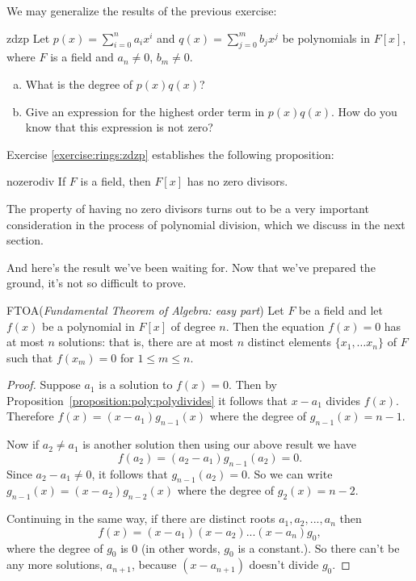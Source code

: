 \noindent
We may generalize the results of the previous exercise:

\begin{exercise}{zdzp}
Let $p(x)=\sum_{i=0}^{n} a_ix^i$ and $q(x)=\sum_{j=0}^{m} b_jx^j$ be polynomials in $F[x]$, where $F$ is a field and $a_n\neq 0$, $b_m\neq 0$.
\begin{enumerate}[(a)]
\item
What is the degree of $p(x)q(x)$?
\item
Give an expression for the highest order term in $p(x)q(x)$. How do you know that this expression is not zero? 
\end{enumerate}
\end{exercise}

Exercise \ref{exercise:rings:zdzp} establishes the following proposition: 

\begin{prop}{nozerodiv} If $F$ is a field, then $F[x]$ has no zero divisors.
\end{prop}

The property of having no zero divisors turns out to be a very important consideration in the process of polynomial division, which we discuss in the next section.

And here's the result we've been waiting for. Now that we've prepared the ground, it's not so difficult to prove.

\begin{prop}{FTOA}(\emph{Fundamental Theorem of Algebra: easy part})
Let $F$ be a field and let $f(x)$ be a polynomial in $F[x]$ of degree $n$. Then the equation $f(x)=0$ has at most $n$ solutions: that is, there are at most $n$ distinct elements $\{x_1,\ldots x_n\}$ of $F$ such that $f(x_m)=0$ for $1 \le m \le n$.
\end {prop}


\begin{proof}
Suppose $a_1$ is a solution to $f(x)=0$. Then by Proposition~\ref{proposition:poly:polydivides} it follows that $x-a_1$ divides $f(x)$. Therefore $f(x) = (x-a_1) g_{n-1}(x)$ where the degree of $g_{n-1}(x)=n-1$. 

Now if $a_2 \neq a_1$ is another solution then using our above result we have
\[ f(a_2) = (a_2 - a_1)g_{n-1}(a_2) = 0. \]
Since $a_2 - a_1 \neq 0$, it follows that $g_{n-1}(a_2) = 0$. So we can write $g_{n - 1}(x) = (x-a_2)g_{n-2}(x)$ where the degree of $g_2(x) = n-2$. 

Continuing in the same way, if there are distinct roots $a_1,a_2,...,a_n$ then 
\[
f(x) = (x - a_1)(x - a_2)...(x - a_n)g_0, \]
 where the degree of $g_0$ is 0 (in other words, $g_0$ is a constant.). So there can't be any more solutions, $a_{n+1}$, because $(x-a_{n+1})$ doesn't divide $g_0$.
\end {proof}


